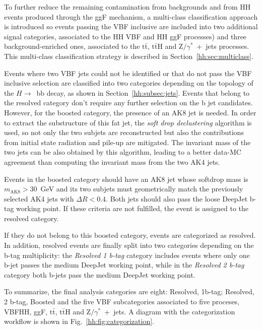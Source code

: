 \documentclass[../main.tex]{subfiles}
\begin{document}
To further reduce the remaining contamination from backgrounds and from HH events produced through the ggF mechanism, a multi-class classification approach is introduced so events passing the VBF inclusive are included into two additional signal categories, associated to the HH VBF and HH ggF processes) and three background-enriched ones, associated to the $\text{t}\bar{\text{t}}$, $\text{t}\bar{\text{t}}$H and Z$/\gamma^*$~+~jets processes. This multi-class classification strategy is described in Section~\ref{hh:sec:multiclass}.

Events where two VBF jets could not be identified or that do not pass the VBF inclusive selection are classified into two categories depending on the topology of the $H\to$~bb decay, as shown in Section~\ref{hh:subsec:jets}. Events that belong to the resolved category don't require any further selection on the b jet candidates. However, for the boosted category, the presence of an AK8 jet is needed. In order to extract the substructure of this fat jet, the \textit{soft drop declustering} \cite{hh:analysis:softdrop} algorithm is used, so not only the two subjets are reconstructed but also the contributions from initial state radiation and pile-up are mitigated. The invariant mass of the two jets can be also obtained by this algorithm, leading to a better data-MC agreement than computing the invariant mass from the two AK4 jets.

Events in the boosted category should have an AK8 jet whose softdrop mass is $m_\text{AK8} > 30$~GeV and its two subjets must geometrically match the previously selected AK4 jets with $\Delta R < 0.4$.  Both jets should also pass the loose DeepJet b-tag working point. If these criteria are not fulfilled, the event is assigned to the resolved category.

If they do not belong to this boosted category, events are categorized as resolved. In addition, resolved events are finally split into two categories depending on the b-tag multiplicity: the \textit{Resolved 1 b-tag} category includes events where only one b-jet passes the medium DeepJet working point, while in the \textit{Resolved 2 b-tag} category both b-jets pass the medium DeepJet working point.

To summarize, the final analysis categories are eight: Resolved, 1b-tag; Resolved, 2 b-tag, Boosted and the five VBF subcategories associated to five proceses, VBFHH, ggF, $\text{t}\bar{\text{t}}$, $\text{t}\bar{\text{t}}$H and Z$/\gamma^*$~+~jets. A diagram with the categorization workflow is shown in Fig.~\ref{hh:fig:categorization}.
\end{document}

